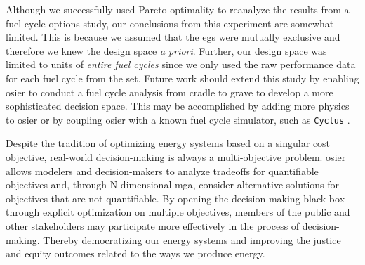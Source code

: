 
Although we successfully used Pareto optimality to reanalyze the results from a
fuel cycle options study, our conclusions from this experiment are somewhat
limited. This is because we assumed that the \glspl{eg} were mutually exclusive
and therefore we knew the design space \textit{a priori}. Further, our design
space was limited to units of \textit{entire fuel cycles} since we only used the
raw performance data for each fuel cycle from the \gls{set}. Future work should
extend this study by enabling \gls{osier} to conduct a fuel cycle analysis from
cradle to grave to develop a more sophisticated decision space. This may be
accomplished by adding more physics to \gls{osier} or by coupling \gls{osier}
with a known fuel cycle simulator, such as \texttt{Cyclus}
\cite{huff_fundamental_2016}.

Despite the tradition of optimizing energy systems based on a singular cost
objective, real-world decision-making is always a multi-objective problem.
\gls{osier} allows modelers and decision-makers to analyze tradeoffs for
quantifiable objectives and, through N-dimensional \gls{mga}, consider
alternative solutions for objectives that are not quantifiable. By opening the
decision-making black box through explicit optimization on multiple objectives,
members of the public and other stakeholders may participate more effectively in
the process of decision-making. Thereby democratizing our energy systems and
improving the justice and equity outcomes related to the ways we produce energy.
